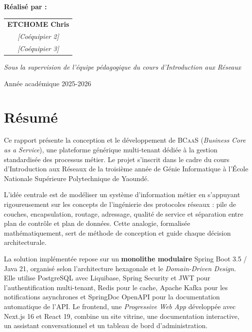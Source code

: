 \documentclass[12pt,a4paper]{report}
\theoremstyle{definition}
\theoremstyle{remark}
\newcommand{\bcaas}{\textsc{BCaaS}}
\newcommand{\api}{\textsc{API}}
\newcommand{\jwt}{\textsc{JWT}}
\begin{document}
\begin{titlepage}
	\vspace{1.0cm}

	{\large\bfseries\textcolor{primary}{Réalisé par :}}\\[0.4cm]
	\begin{tabular}{c}
		\textbf{ETCHOME Chris}\\[0.15cm]
		\textit{[Coéquipier 2]}\\[0.15cm]
		\textit{[Coéquipier 3]}
	\end{tabular}

	\vspace{0.6cm}
	{\small\textit{Sous la supervision de l'équipe pédagogique du cours d'Introduction aux Réseaux}}

	\vfill
	{\small\textcolor{primary}{Année académique 2025-2026}}
\end{titlepage}

\chapter*{Résumé}

Ce rapport présente la conception et le développement de \bcaas{} (\textit{Business Core as a Service}), une plateforme générique multi-tenant dédiée à la gestion standardisée des processus métier. Le projet s'inscrit dans le cadre du cours d'Introduction aux Réseaux de la troisième année de Génie Informatique à l'École Nationale Supérieure Polytechnique de Yaoundé.

L'idée centrale est de modéliser un système d'information métier en s'appuyant rigoureusement sur les concepts de l'ingénierie des protocoles réseaux : pile de couches, encapsulation, routage, adressage, qualité de service et séparation entre plan de contrôle et plan de données. Cette analogie, formalisée mathématiquement, sert de méthode de conception et guide chaque décision architecturale.

La solution implémentée repose sur un \textbf{monolithe modulaire} Spring Boot 3.5 / Java 21, organisé selon l'architecture hexagonale et le \textit{Domain-Driven Design}. Elle utilise PostgreSQL avec Liquibase, Spring Security et \jwt{} pour l'authentification multi-tenant, Redis pour le cache, Apache Kafka pour les notifications asynchrones et SpringDoc OpenAPI pour la documentation automatique de l'\api. Le frontend, une \textit{Progressive Web App} développée avec Next.js 16 et React 19, combine un site vitrine, une documentation interactive, un assistant conversationnel et un tableau de bord d'administration.
\end{document}
